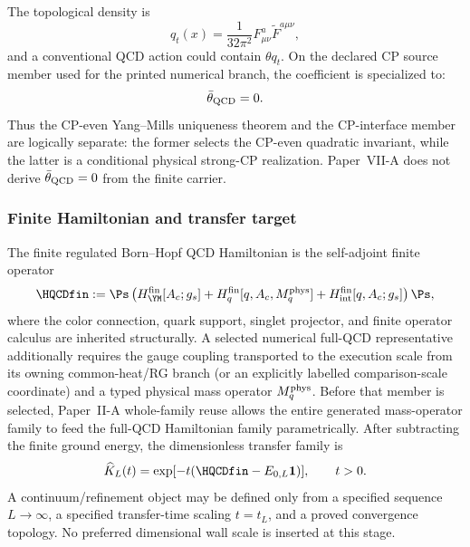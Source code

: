\documentclass[12pt,a4paper]{article}
\begin{document}
\begin{definition}
\label{p10:def:strong-cp-term-separation}
The topological density is
\begin{equation}
\label{p10:eq:theta-density}
q_t(x)=\frac{1}{32\pi^2}F_{\mu\nu}^a\widetilde F^{a\mu\nu},
\end{equation}
and a conventional QCD action could contain \(\theta q_t\).  On the declared CP source member used for the printed numerical branch, the coefficient is specialized to:
\begin{equation}
\label{p10:eq:theta-zero-separation}
\bar\theta_{\rm QCD}=0.
\end{equation}
Thus the CP-even Yang--Mills uniqueness theorem and the CP-interface member are logically separate: the former selects the CP-even quadratic invariant, while the latter is a conditional physical strong-CP realization.  Paper~VII-A does not derive \(\bar\theta_{\rm QCD}=0\) from the finite carrier.
\end{definition}


\subsubsection{Finite Hamiltonian and transfer target}
\label{p10:subsec:finite-hamiltonian-transfer-target}

\begin{definition}
\label{p10:def:finite-strong-hamiltonian}
The finite regulated Born--Hopf QCD Hamiltonian is the self-adjoint finite operator
\begin{equation}
\label{p10:eq:finite-strong-hamiltonian}
\HQCDfin
:=
\Ps
\left(
H_{\YM}^{\rm fin}[A_c;g_s]
+H_q^{\rm fin}[q,A_c,M_q^{\rm phys}]
+H_{\rm int}^{\rm fin}[q,A_c;g_s]
\right)
\Ps,
\end{equation}
where the color connection, quark support, singlet projector, and finite operator calculus are inherited structurally.  A selected numerical full-QCD representative additionally requires the gauge coupling transported to the execution scale from its owning common-heat/RG branch (or an explicitly labelled comparison-scale coordinate) and a typed physical mass operator \(M_q^{\rm phys}\).  Before that member is selected, Paper~II-A whole-family reuse allows the entire generated mass-operator family to feed the full-QCD Hamiltonian family parametrically.  After subtracting the finite ground energy, the dimensionless transfer family is
\begin{equation}
\label{p10:eq:qcd-hamiltonian-transfer-target}
\widehat K_L(t)=\exp[-t(\HQCDfin-E_{0,L}\mathbf 1)],\qquad t>0.
\end{equation}
A continuum/refinement object may be defined only from a specified sequence \(L\to\infty\), a specified transfer-time scaling \(t=t_L\), and a proved convergence topology.  No preferred dimensional wall scale is inserted at this stage.
\end{definition}
\end{document}
